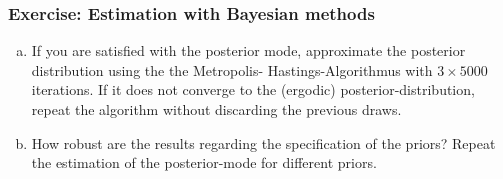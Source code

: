 \documentclass[handout]{beamer}  %
\newcounter{saveenumi}
\newcommand{\seti}{\setcounter{saveenumi}{\value{enumi}}}
\newcommand{\conti}{\setcounter{enumi}{\value{saveenumi}}}
\begin{document}
\begin{frame}\frametitle{Exercise: Estimation with Bayesian methods}
  \begin{enumerate}[(a)]\conti
      \item If you are satisfied with the posterior mode, approximate the posterior distribution using the the Metropolis- Hastings-Algorithmus with $3\times 5000$ iterations. If it does not converge to the (ergodic) posterior-distribution, repeat the algorithm without discarding the previous draws.
  \item How robust are the results regarding the specification of the priors? Repeat the estimation of the posterior-mode for different priors.
\seti\end{enumerate}
\end{frame}
\end{document}
